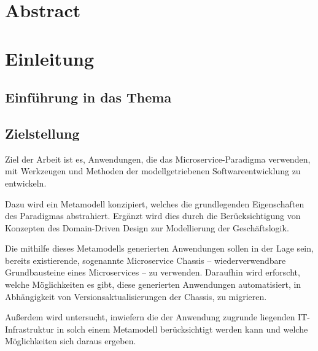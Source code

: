 \chapter{Abstract}

\chapter{Einleitung}

\section{Einführung in das Thema}

\section{Zielstellung}

Ziel der Arbeit ist es, Anwendungen, die das Microservice-Paradigma verwenden, mit Werkzeugen und Methoden der modellgetriebenen Softwareentwicklung zu entwickeln.

Dazu wird ein Metamodell konzipiert, welches die grundlegenden Eigenschaften des Paradigmas abstrahiert. Ergänzt wird dies durch die Berücksichtigung von Konzepten des Domain-Driven Design zur Modellierung der Geschäftslogik.

Die mithilfe dieses Metamodells generierten Anwendungen sollen in der Lage sein, bereits existierende, sogenannte Microservice Chassis – wiederverwendbare Grundbausteine eines Microservices – zu verwenden. Daraufhin wird erforscht, welche Möglichkeiten es gibt, diese generierten Anwendungen automatisiert, in Abhängigkeit von Versionsaktualisierungen der Chassis, zu migrieren.

Außerdem wird untersucht, inwiefern die der Anwendung zugrunde liegenden IT-Infrastruktur in solch einem Metamodell berücksichtigt werden kann und welche Möglichkeiten sich daraus ergeben.